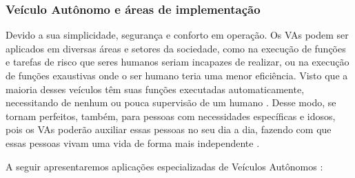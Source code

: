 \subsubsection{Veículo Autônomo e áreas de implementação} \label{implementacao}

Devido a sua simplicidade, segurança e conforto em operação. Os VAs podem ser aplicados em diversas áreas e setores da sociedade, como na execução de funções e tarefas de risco que seres humanos seriam incapazes de realizar, ou na execução de funções exaustivas onde o ser humano teria uma menor eficiência. Visto que a maioria desses veículos têm suas funções executadas automaticamente, necessitando de nenhum ou pouca supervisão de um humano \cite{mundobrasil}. Desse modo, se tornam perfeitos, também, para pessoas com necessidades específicas e idosos, pois os VAs poderão auxiliar essas pessoas no seu dia a dia, fazendo com que essas pessoas vivam uma vida de forma mais independente \cite{4cenarios_ocidental}. 
\vspace {1cm}

A seguir apresentaremos aplicações especializadas de Veículos Autônomos \cite{aplicacao2}:

